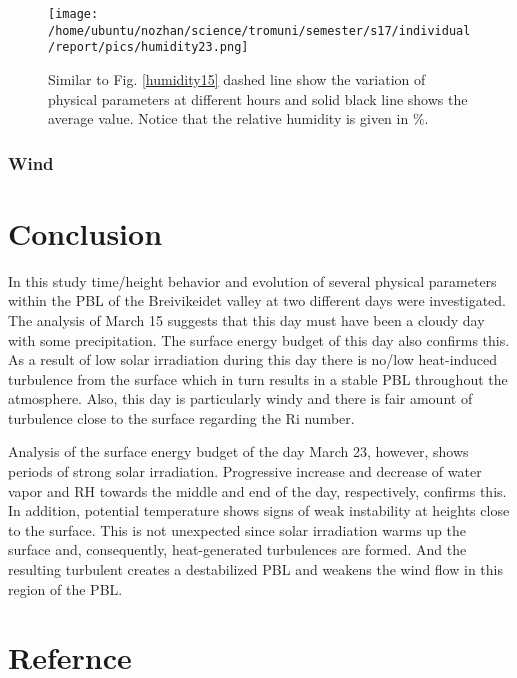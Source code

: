 \documentclass[a4paper,12pt]{article}
\numberwithin{equation}{section} %
\begin{document}
\begin{figure}[bhp]
\texttt{[image: /home/ubuntu/nozhan/science/tromuni/semester/s17/individual/report/pics/humidity23.png]}
\caption{Similar to Fig. \ref{humidity15} dashed line show the variation of physical parameters at different hours and solid black line shows the average value. Notice that the relative humidity is given in $\%$.}
\label{humidity23}
\end{figure}

\subsubsection{Wind}








\newpage

\section {Conclusion}

In this study time/height behavior and evolution of several physical parameters within the PBL of the Breivikeidet valley at two different days were investigated. The analysis of March 15 suggests that this day must have been a cloudy day with some precipitation. The surface energy budget of this day also confirms this. As a result of low solar irradiation during this day there is no/low heat-induced turbulence from the surface which in turn results in a stable PBL throughout the atmosphere. Also, this day is particularly windy and there is fair amount of turbulence close to the surface regarding the Ri number.

Analysis of the surface energy budget of the day March 23, however, shows periods of strong solar irradiation. Progressive increase and decrease of water vapor and RH towards the middle and end of the day, respectively, confirms this. In addition, potential temperature shows signs of weak instability at heights close to the surface. This is not unexpected since solar irradiation warms up the surface and, consequently, heat-generated turbulences are formed. And the resulting turbulent creates a destabilized PBL and weakens the wind flow in this region of the PBL.  

\newpage

\section*{Refernce}


\end{document}
